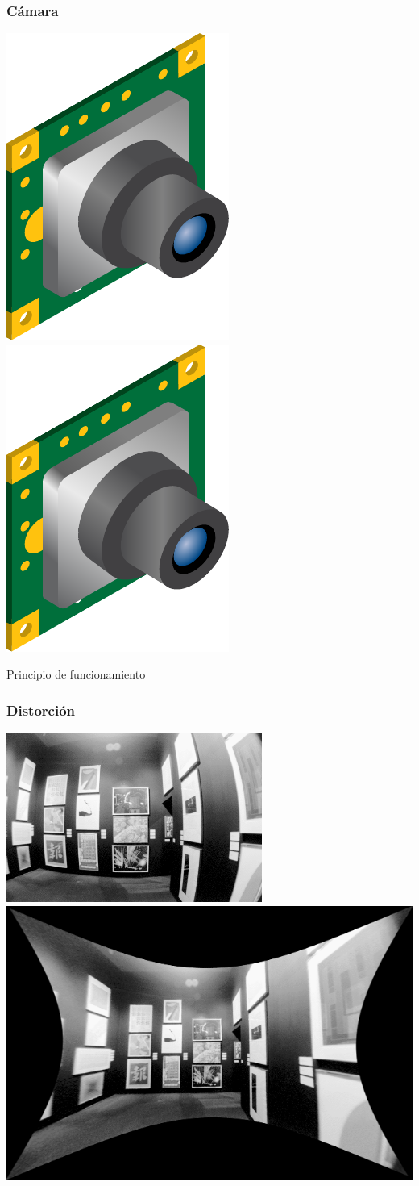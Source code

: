 \begin{frame}
    \frametitle{Cámara}
    
    \includegraphics[width=0.4\columnwidth]{images/camera/}
    \includegraphics[width=0.4\columnwidth]{images/camera/}
    \footnotesize
    
    \begin{block}{Principio de funcionamiento}
    	
    \end{block}

\end{frame}

\begin{frame}
	\frametitle{Distorción}
	
	\includegraphics[width=0.4\columnwidth]{images/camera/distorted_image.png}
	\includegraphics[width=0.4\columnwidth]{images/camera/undistorted_image.png}
	
\end{frame}


